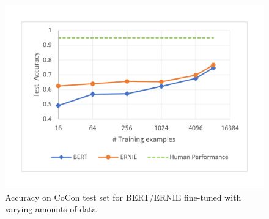 \begin{figure}[h!]
	\centering
	\includegraphics[width=0.9\columnwidth]{images/learnCurveLine.pdf}
	\caption{Accuracy on CoCon test set for BERT/ERNIE fine-tuned with varying amounts of data}
	\label{fig:learnCurve}
\end{figure}

